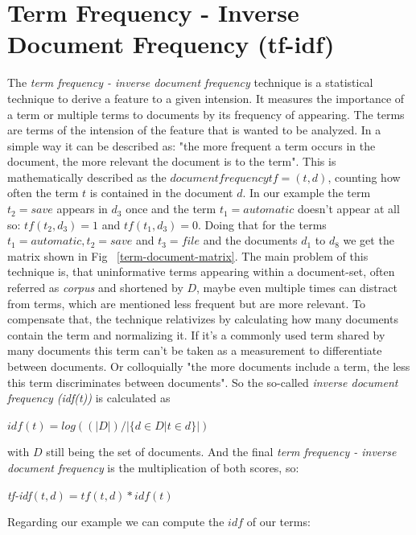\section{Term Frequency - Inverse Document Frequency (tf-idf)}
The \emph{term frequency - inverse document frequency} technique is a statistical technique to derive a feature to a given intension. It measures the importance of a term or multiple terms to documents by its frequency of appearing. The terms are terms of the intension of the feature that is wanted to be analyzed. In a simple way it can be described as: "the more frequent a term occurs in the document, the more relevant the document is to the term". \newline
This is mathematically described as the $document frequency tf=(t,d)$, counting how often the term $t$ is contained in the document $d$.
In our example the term $t_2 = save$ appears in $d_3$ once and the term $t_1 = automatic$ doesn't appear at all so: $tf(t_2,d_3) = 1$ and $tf(t_1,d_3)=0$. \newline
Doing that for the terms $t_1 = automatic, t_2 = save$ and $t_3 = file$ and the documents $d_1$ to $d_8$ we get the matrix shown in Fig ~\ref{term-document-matrix}.
The main problem of this technique is, that uninformative terms appearing within a document-set, often referred as \emph{corpus} and shortened by $D$, maybe even multiple times can distract from terms, which are mentioned less frequent but are more relevant. To compensate that, the technique relativizes by calculating how many documents contain the term and normalizing it. If it's a commonly used term shared by many documents this term can't be taken as a measurement to differentiate between documents. Or colloquially "the more documents include a term, the less this term discriminates between documents". \newline
So the so-called \emph{inverse document frequency (idf(t))} is calculated as
\begin{center}$idf(t) = log((|D|)/|\{ d \in D | t \in d \}|)$  \end{center}
with $D$ still being the set of documents. And the final \emph{term frequency - inverse document frequency} is the multiplication of both scores, so:
\begin{center} \emph{tf-idf}$(t,d) = tf(t,d) * idf(t)$\end{center}
Regarding our example we can compute the $idf$ of our terms:


